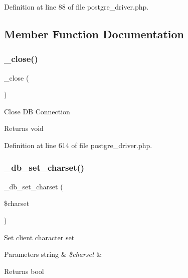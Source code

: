 Definition at line 88 of file postgre\+\_\+driver.\+php.



\subsection{Member Function Documentation}
\mbox{\label{class_c_i___d_b__postgre__driver_a4d9082658000e5ede8312067c6dda9db}} 
\subsubsection{\texorpdfstring{\_close()}{\_close()}}
{\footnotesize\ttfamily \+\_\+close (\begin{DoxyParamCaption}{ }\end{DoxyParamCaption})\hspace{0.3cm}{\ttfamily [protected]}}

Close DB Connection

\begin{DoxyReturn}{Returns}
void 
\end{DoxyReturn}


Definition at line 614 of file postgre\+\_\+driver.\+php.

\mbox{\label{class_c_i___d_b__postgre__driver_a2b808d420d8e9fea0b73ad7127f5efb8}} 
\subsubsection{\texorpdfstring{\_db\_set\_charset()}{\_db\_set\_charset()}}
{\footnotesize\ttfamily \+\_\+db\+\_\+set\+\_\+charset (\begin{DoxyParamCaption}\item[{}]{\$charset }\end{DoxyParamCaption})\hspace{0.3cm}{\ttfamily [protected]}}

Set client character set


\begin{DoxyParams}[1]{Parameters}
string & {\em \$charset} & \\
\hline
\end{DoxyParams}
\begin{DoxyReturn}{Returns}
bool 
\end{DoxyReturn}


